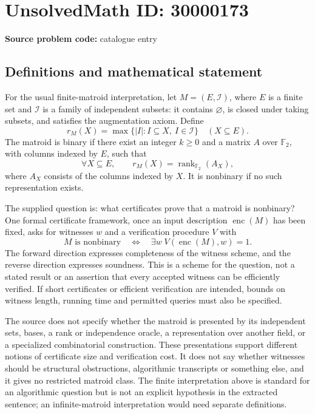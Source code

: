 \documentclass[11pt]{article}
\newcommand{\F}{\mathbb{F}}
\begin{document}
\section*{UnsolvedMath ID: 30000173}
\textbf{Source problem code:} catalogue entry
\subsection{Definitions and mathematical statement}
For the usual finite-matroid interpretation, let \(M=(E,\mathcal I)\), where \(E\) is a finite set and \(\mathcal I\) is a family of independent subsets: it contains \(\varnothing\), is closed under taking subsets, and satisfies the augmentation axiom. Define
\[
 r_M(X)=\max\{|I|:I\subseteq X,\ I\in\mathcal I\}\quad(X\subseteq E).
\]
The matroid is binary if there exist an integer \(k\geq0\) and a matrix \(A\) over \(\F_2\), with columns indexed by \(E\), such that
\[
 \forall X\subseteq E,\qquad r_M(X)=\operatorname{rank}_{\F_2}(A_X),
\]
where \(A_X\) consists of the columns indexed by \(X\). It is nonbinary if no such representation exists.

The supplied question is: what certificates prove that a matroid is nonbinary? One formal certificate framework, once an input description \(\operatorname{enc}(M)\) has been fixed, asks for witnesses \(w\) and a verification procedure \(V\) with
\[
 M\text{ is nonbinary}\quad\Longleftrightarrow\quad
 \exists w\;V(\operatorname{enc}(M),w)=1.
\]
The forward direction expresses completeness of the witness scheme, and the reverse direction expresses soundness. This is a scheme for the question, not a stated result or an assertion that every accepted witness can be efficiently verified. If short certificates or efficient verification are intended, bounds on witness length, running time and permitted queries must also be specified.

The source does not specify whether the matroid is presented by its independent sets, bases, a rank or independence oracle, a representation over another field, or a specialized combinatorial construction. These presentations support different notions of certificate size and verification cost. It does not say whether witnesses should be structural obstructions, algorithmic transcripts or something else, and it gives no restricted matroid class. The finite interpretation above is standard for an algorithmic question but is not an explicit hypothesis in the extracted sentence; an infinite-matroid interpretation would need separate definitions.
\end{document}

